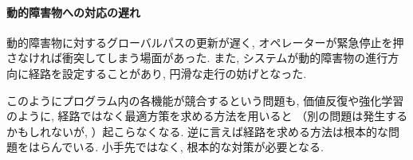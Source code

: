 \paragraph{動的障害物への対応の遅れ}
動的障害物に対するグローバルパスの更新が遅く, 
オペレーターが緊急停止を押さなければ衝突してしまう場面があった. 
また, システムが動的障害物の進行方向に経路を設定することがあり, 
円滑な走行の妨げとなった. 

このようにプログラム内の各機能が競合するという問題も, 
価値反復や強化学習のように, 
経路ではなく最適方策を求める方法を用いると
（別の問題は発生するかもしれないが, ）起こらなくなる. 
逆に言えば経路を求める方法は根本的な問題をはらんでいる. 
小手先ではなく, 根本的な対策が必要となる. 


